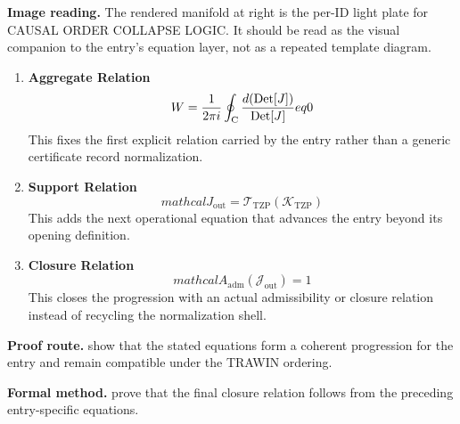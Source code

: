 \begin{samepage}
\noindent\begin{minipage}[t]{0.45\linewidth}
\vspace{0pt}
\raggedright
\scriptsize\textbf{Image reading.} The rendered manifold at right is the per-ID light plate for CAUSAL ORDER COLLAPSE LOGIC. It should be read as the visual companion to the entry's equation layer, not as a repeated template diagram.\par
\end{minipage}\hfill
\begin{minipage}[t]{0.53\linewidth}
\vspace*{-0.10in}
\raggedright
{}
\end{minipage}
\end{samepage}

\clearpage


\begin{enumerate}[leftmargin=1.6em,itemsep=9pt,topsep=6pt]
\item \textbf{Aggregate Relation}
\[
W = \frac{1}{2\pi i} \oint_{\mathrm{C}} \frac{d(\text{Det}[J])}{{\rm Det}[J]}  eq 0
\]
This fixes the first explicit relation carried by the entry rather than a generic certificate record normalization.

\item \textbf{Support Relation}
\[
mathcal{J}_{\mathrm{out}} = \mathcal{T}_{\mathrm{TZP}}\!\left(\mathcal{K}_{\mathrm{TZP}}\right)
\]
This adds the next operational equation that advances the entry beyond its opening definition.

\item \textbf{Closure Relation}
\[
mathcal{A}_{\mathrm{adm}}\!\left(\mathcal{J}_{\mathrm{out}}\right)=1
\]
This closes the progression with an actual admissibility or closure relation instead of recycling the normalization shell.
\end{enumerate}

\textbf{Proof route.} show that the stated equations form a coherent progression for the entry and remain compatible under the TRAWIN ordering.

\textbf{Formal method.} prove that the final closure relation follows from the preceding entry-specific equations.

\medskip
{}

